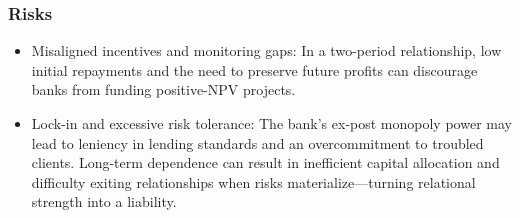 \subsubsection*{Risks}
\begin{itemize}
    \item Misaligned incentives and monitoring gaps: In a two-period relationship, low initial repayments and the need to preserve future profits can discourage banks from funding positive-NPV projects.
    \item Lock-in and excessive risk tolerance: The bank's ex-post monopoly power may lead to leniency in lending standards and an overcommitment to troubled clients. Long-term dependence can result in inefficient capital allocation and difficulty exiting relationships when risks materialize---turning relational strength into a liability.
\end{itemize}